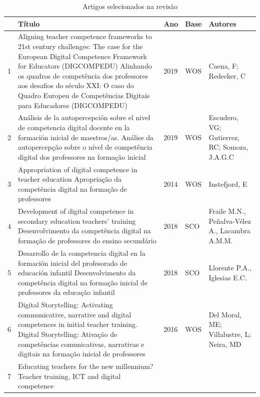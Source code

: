 \documentclass[portuguese]{textolivre}
\begin{document}
\begin{small}
\renewcommand{\arraystretch}{1.5}
\begin{longtable}{
    @{}l >{\raggedright\arraybackslash}p{}
    @{}ll
    >{\raggedright\arraybackslash}p{}@{}
    }
\caption{Artigos selecionados na revisão}
\label{tbl02}
\\
\toprule
	& Título & Ano & Base & Autores \\
\midrule
1 & Aligning teacher competence frameworks to 21st century challenges: The case for the European Digital Competence Framework for Educators (DIGCOMPEDU) \newline
Alinhando os quadros de competência dos professores aos desafios do século XXI: O caso do Quadro Europeu de Competências Digitais para Educadores (DIGCOMPEDU) & 2019 & WOS & Caena, F; Redecker, C \\
2 & Análisis de la autopercepción sobre el nivel de competencia digital docente en la formación inicial de maestros/as. \newline
Análise da autopercepção sobre o nível de competência digital dos professores na formação inicial & 2019 & WOS	& Escudero, VG; Gutierrez, RC; Somoza, J.A.G.C \\
3 &	Appropriation of digital competence in teacher education \newline
Apropriação da competência digital na formação de professores & 2014 & WOS & Instefjord, E \\
4 & Development of digital competence in secondary education teachers’ training \newline
Desenvolvimento da competência digital na formação de professores do ensino secundário & 2018 & SCO & Fraile M.N., Peñalva-Vélez A., Lacambra A.M.M. \\
5 & Desarrollo de la competencia digital en la formación inicial del profesorado de educación infantil \newline 
Desenvolvimento da competência digital na formação inicial de professores da educação infantil & 2018 & SCO & Llorente P.A., Iglesias E.C. \\
6 & Digital Storytelling: Activating communicative, narrative and digital competences in initial teacher training. \newline 
Digital Storytelling: Ativação de competências comunicativas, narrativas e digitais na formação inicial de professores & 2016 & WOS & Del Moral, ME; Villalustre, L; 
Neira, MD \\
7 & Educating teachers for the new millennium? Teacher training, ICT and digital competence \newline

\end{longtable}
\end{small}
\end{document}
